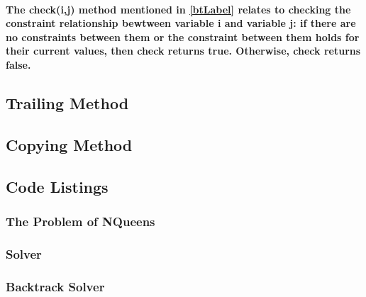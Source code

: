 \documentclass{article}
\begin{document}
\paragraph*{The check(i,j) method mentioned in \ref{btLabel} relates to checking the constraint relationship bewtween variable i and variable j: if there are no constraints between them or the constraint between them holds for their current values, then check returns true. Otherwise, check returns false.}

\subsection*{Trailing Method}
\subsection*{Copying Method}

\subsection*{Code Listings}
\subsubsection*{The Problem of NQueens}



\subsubsection*{Solver}


\subsubsection*{Backtrack Solver}





\end{document}

